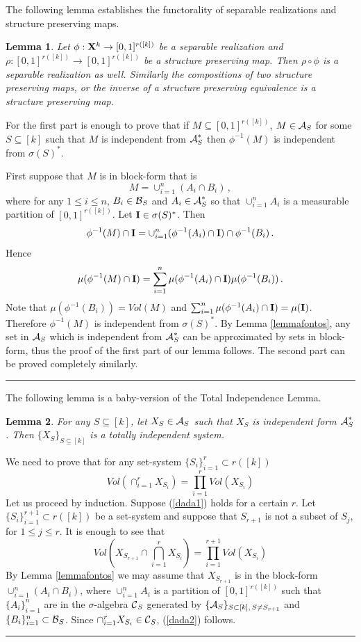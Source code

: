 \documentclass [11pt] {article}
\newcommand{\qed} {\hspace {0.1in} \rule {1.5mm} {3.5mm}}
\newtheorem{lemma}{Lemma}[section]
\def\proof{\smallskip\noindent{\it Proof.} }
\def\bI{{\bf I}}
\def\cA{\mbox{$\cal A$}}
\def\cB{\mbox{$\cal B$}}
\def\cC{\mbox{$\cal C$}}
\def\cA{\mbox{$\cal A$}}
\def\cB{\mbox{$\cal B$}}
\def\cC{\mbox{$\cal C$}}
\def\to{\rightarrow}
\def\xo{{\bf X}}
\begin{document}
\bigskip
\noindent
The following lemma establishes the functorality of
separable realizations and structure preserving maps.
\begin{lemma} \label{functor}
Let $\phi:\xo^k\to [0,1]^{r([k])}$ be
a separable realization and $\rho: [0,1]^{r([k])}\to [0,1]^{r([k])}$
be a structure preserving map. Then $\rho\circ\phi$ is a separable
realization as well. Similarly the compositions of two
structure preserving maps, or the inverse of a structure preserving
equivalence is a structure preserving map.
\end{lemma}
\proof
For the first part is enough to prove that
if $M\subseteq [0,1]^{r([k])}$, $M\in \cA_S$ for some $S\subseteq [k]$
 such that
$M$ is independent from $\cA^*_S$ then $\phi^{-1}(M)$ is independent
from $\sigma(S)^*$.

\noindent
First suppose that $M$ is in block-form that is
$$M=\cup^n_{i=1}(A_i\cap B_i)\,,$$
where for any $1\leq i \leq n$, $B_i\in\cB_S$ and $A_i\in \cA^*_S$
so that $\cup^n_{i=1} A_i$ is a measurable partition of $[0,1]^{r([k])}$.
Let $\bI\in\sigma(S)^*$. Then
$$\phi^{-1}(M)\cap \bI=\cup^n_{i=1} (\phi^{-1}(A_i)\cap \bI)\cap
\phi^{-1}(B_i)\,.$$
Hence
$$\mu(\phi^{-1}(M)\cap \bI)=\sum^n_{i=1} \mu(\phi^{-1}(A_i)\cap \bI)
\mu(\phi^{-1}(B_i))\,.$$
Note that $\mu(\phi^{-1}(B_i))=Vol(M)$ and 
$\sum^n_{i=1} \mu(\phi^{-1}(A_i)\cap \bI)=\mu(\bI)$.
Therefore $\phi^{-1}(M)$ is independent from $\sigma(S)^*$.
By Lemma \ref{lemmafontos}, any set in $\cA_S$ which is independent
from $\cA^*_S$ can be approximated by sets in block-form, thus the
proof of the first part of our lemma follows. The second part 
can be proved completely similarly. \qed

\bigskip
\noindent
The following lemma is a baby-version of the Total Independence Lemma.
\begin{lemma} \label{baby}
For any $S\subseteq [k]$, let $X_S\in \cA_S$ such that $X_S$ is independent
form $\cA_S^*$. Then $\{X_S\}_{S\subseteq [k]}$ is a totally independent
system.
\end{lemma}
\proof
We need to prove that for any
set-system $\{S_i\}^r_{i=1}\subset r([k])$
\begin{equation}
\label{dada1}
Vol(\cap^r_{i=1} X_{S_i})=\prod^r_{i=1} Vol(X_{S_i})
\end{equation}
Let us proceed by induction. Suppose (\ref{dada1}) holds for a certain $r$.
Let $\{S_i\}^{r+1}_{i=1}\subset r([k])$ be a set-system and
suppose that $S_{r+1}$ is not a subset of $S_j$, for $1\leq j \leq r$.
It is enough to see that
\begin{equation}
\label{dada2}
Vol(X_{S_{r+1}}\cap\bigcap^r_{i=1} X_{S_i})=\prod^{r+1}_{i=1} Vol(X_{S_i})
\end{equation}
By Lemma \ref{lemmafontos} we may assume that $X_{S_{r+1}}$ is in
the block-form $\cup^n_{i=1}(A_i\cap B_i)$,
where $\cup^n_{i=1} A_i$ is a partition of $[0,1]^{r([k])}$ such that
$\{A_i\}^n_{i=1}$ are in the $\sigma$-algebra $\cC_S$ generated
by $\{\cA_S\}_{S\subset [k],\,S\neq S_{r+1}}$ and
$\{B_i\}^n_{i=1}\subset \cB_S$. Since $\cap^r_{i=1} X_{S_i}\in \cC_S$,
(\ref{dada2}) follows. 
\qed
\end{document}
